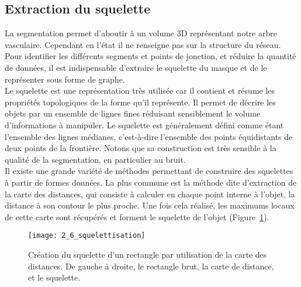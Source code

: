 \subsection{Extraction du squelette}	
La segmentation permet d’aboutir à un volume 3D représentant notre arbre vasculaire. Cependant en l’état il ne renseigne pas sur la structure du réseau. Pour identifier les différents segments et points de jonction, et réduire la quantité de données, il est indispensable d’extraire le squelette du masque et de le représenter sous forme de graphe. \\
Le squelette est une représentation très utilisée car il contient et résume les propriétés topologiques de la forme qu’il représente. Il permet  de décrire les objets par un ensemble de lignes fines réduisant sensiblement le volume d’informations à manipuler. Le squelette est généralement défini comme étant l’ensemble des lignes médianes, c’est-à-dire l’ensemble des points équidistants de deux points de la frontière. Notons que sa construction est très sensible à la qualité de la segmentation, en particulier au bruit.  \\
Il existe une grande variété de méthodes permettant de construire des squelettes à partir de formes données. La plus commune est la méthode dite d’extraction de la carte des distances, qui consiste à calculer en chaque point interne à l’objet, la distance à son contour le plus proche. Une fois cela réalisé, les maximums locaux de cette carte sont récupérés et forment le squelette de l’objet (Figure~\ref{fig:2_6_squelettisation}). 
\begin{figure}[!t]
\centering
\texttt{[image: 2\_6\_squelettisation]}
\caption{Création du squelette d'un rectangle par utilisation de la carte des distances. De gauche à droite, le rectangle brut, la carte de distance, et le squelette.}
\label{fig:2_6_squelettisation}	
\end{figure}	

